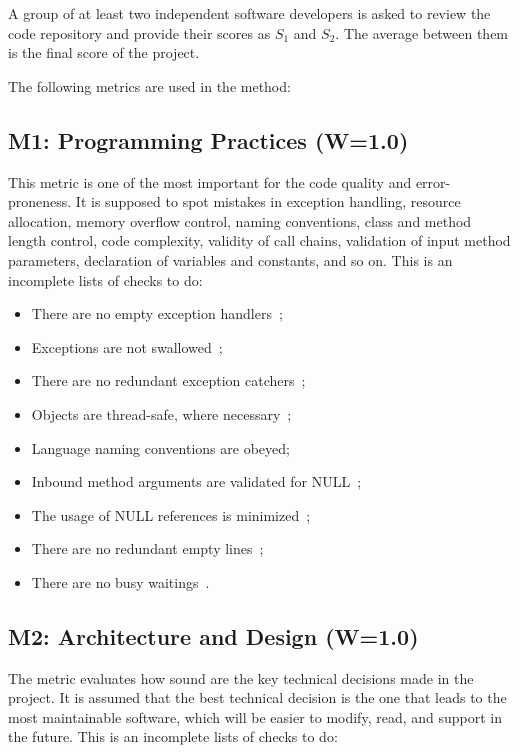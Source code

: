 \documentclass[12pt,oneside]{article}
\begin{document}
A group of at least two independent software developers is asked to review the code repository and provide their scores as $S_1$ and $S_2$. The average between them is the final score of the project.

The following metrics are used in the method:

\subsection{M1: Programming Practices (W=1.0)}

This metric is one of the most important for the code quality and error-proneness.
It is supposed to spot mistakes in exception handling, resource allocation, memory overflow control,
naming conventions, class and method length control, code complexity,
validity of call chains, validation of input method parameters,
declaration of variables and constants,
and so on. This is an incomplete lists of checks to do:

\begin{itemize}
\item There are no empty exception handlers~\citep[pp.205--208]{eo1};
\item Exceptions are not swallowed~\citep[pp.212]{eo1};
\item There are no redundant exception catchers~\citep[pp.202]{eo1};
\item Objects are thread-safe, where necessary~\citep[pp.89-93]{eo1};
\item Language naming conventions are obeyed;
\item Inbound method arguments are validated for NULL~\citep[pp.146-153]{eo1};
\item The usage of NULL references is minimized~\citep[pp.87--89]{eo1};
\item There are no redundant empty lines~\citep{yb-empty-lines};
\item There are no busy waitings~\citep{so-busywait}.
\end{itemize}

\subsection{M2: Architecture and Design (W=1.0)}

The metric evaluates how sound are the key technical decisions made
in the project. It is assumed that the best technical decision is the
one that leads to the most maintainable software, which will be easier
to modify, read, and support in the future. This is an incomplete lists of
checks to do:
\end{document}
